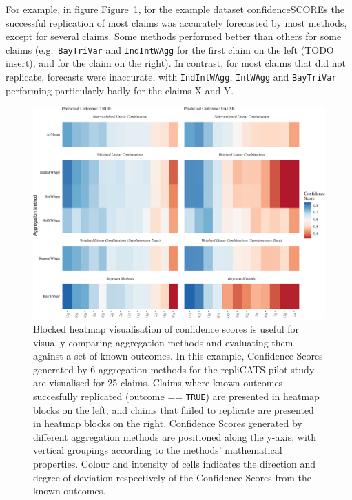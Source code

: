 \documentclass[article]{jss}
\begin{document}
For example, in figure Figure~\ref{fig-heatmap}, for the example dataset
{confidenceSCOREs} the successful replication of most claims was
accurately forecasted by most methods, except for several claims. Some
methods performed better than others for some claims
(e.g.~\texttt{BayTriVar} and \texttt{IndIntWAgg} for the first claim on
the left (TODO insert), and for the claim on the right). In contrast,
for most claims that did not replicate, forecasts were inaccurate, with
\texttt{IndIntWAgg}, \texttt{IntWAgg} and \texttt{BayTriVar} performing
particularly badly for the claims X and Y.

\begin{figure}

{\centering \includegraphics{ms_files/figure-pdf/fig-heatmap-1.pdf}

}

\caption{\label{fig-heatmap}Blocked heatmap visualisation of confidence
scores is useful for visually comparing aggregation methods and
evaluating them against a set of known outcomes. In this example,
Confidence Scores generated by 6 aggregation methods for the repliCATS
pilot study are visualised for 25 claims. Claims where known outcomes
succesfully replicated (outcome == \texttt{TRUE}) are presented in
heatmap blocks on the left, and claims that failed to replicate are
presented in heatmap blocks on the right. Confidence Scores generated by
different aggregation methods are positioned along the y-axis, with
vertical groupings according to the methods' mathematical properties.
Colour and intensity of cells indicates the direction and degree of
deviation respectively of the Confidence Scores from the known
outcomes.}

\end{figure}
\end{document}
